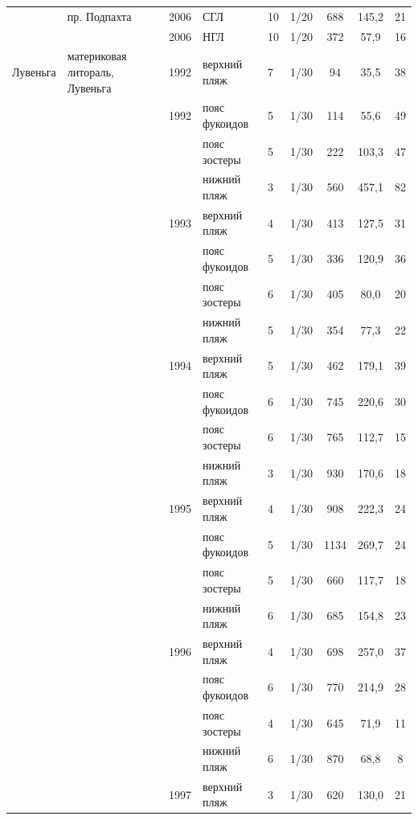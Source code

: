\documentclass[12pt, a4paper]{disser}
\begin{document}
\begin{footnotesize}
\begin{longtable}{|p{2cm}|p{3cm}|p{1cm}|p{2cm}|p{1.5cm}|p{1cm}|*{3}{c|}}
		\\ \cline{2-9}
		 & пр. Подпахта & 2006 & СГЛ & 10 & 1/20 & 688 & 145,2 & 21
		\\ \cline{3-9}
		 &  & 2006 & НГЛ & 10 & 1/20 & 372 & 57,9 & 16
		\\ \hline
	Лувеньга & материковая литораль, Лувеньга & 1992 & верхний пляж & 7 & 1/30 & 94 & 35,5 & 38
		\\ \cline{4-9}
		 &  & 1992 & пояс фукоидов & 5 & 1/30 & 114 & 55,6 & 49
		\\ \cline{4-9}
		 &  &  & пояс зостеры & 5 & 1/30 & 222 & 103,3 & 47
		\\ \cline{4-9}
		 &  &  & нижний пляж & 3 & 1/30 & 560 & 457,1 & 82
		\\ \cline{3-9}
		 &  & 1993 & верхний пляж & 4 & 1/30 & 413 & 127,5 & 31
		\\ \cline{4-9}
		 &  &  & пояс фукоидов & 5 & 1/30 & 336 & 120,9 & 36
		\\ \cline{4-9}
		 &  &  & пояс зостеры & 6 & 1/30 & 405 & 80,0 & 20
		\\ \cline{4-9}
		 &  & & нижний пляж & 5 & 1/30 & 354 & 77,3 & 22
		\\ \cline{3-9}
		 &  & 1994 & верхний пляж & 5 & 1/30 & 462 & 179,1 & 39
		\\ \cline{4-9}
		 &  &  & пояс фукоидов & 6 & 1/30 & 745 & 220,6 & 30
		\\ \cline{4-9}
		 &  &  & пояс зостеры & 6 & 1/30 & 765 & 112,7 & 15
		\\ \cline{4-9}
		 &  &  & нижний пляж & 3 & 1/30 & 930 & 170,6 & 18
		\\ \cline{3-9}
		 &  & 1995 & верхний пляж & 4 & 1/30 & 908 & 222,3 & 24
		\\ \cline{4-9}
		 &  &  & пояс фукоидов & 5 & 1/30 & 1134 & 269,7 & 24
		\\ \cline{4-9}
		 &  &  & пояс зостеры & 5 & 1/30 & 660 & 117,7 & 18
		\\ \cline{4-9}
		 &  &  & нижний пляж & 6 & 1/30 & 685 & 154,8 & 23
		\\ \cline{3-9}
		 &  & 1996 & верхний пляж & 4 & 1/30 & 698 & 257,0 & 37
		\\ \cline{4-9}
		 &  &  & пояс фукоидов & 6 & 1/30 & 770 & 214,9 & 28
		\\ \cline{4-9}
		 &  &  & пояс зостеры & 4 & 1/30 & 645 & 71,9 & 11
		\\ \cline{4-9}
		 &  &  & нижний пляж & 6 & 1/30 & 870 & 68,8 & 8
		\\ \cline{3-9}
		 &  & 1997 & верхний пляж & 3 & 1/30 & 620 & 130,0 & 21

\end{longtable}
\end{footnotesize}
\end{document}
